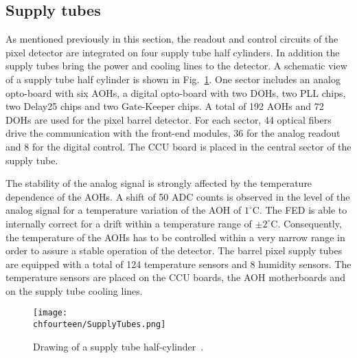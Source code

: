 \subsection{Supply tubes}

As mentioned previously in this section, the readout and control circuits of the pixel detector are integrated on four supply tube half cylinders.
In addition the supply tubes bring the power and cooling lines to the detector.
A schematic view of a supply tube half cylinder is shown in Fig.~\ref{fig:SupplyTubes}.
One sector includes an analog opto-board with six AOHs, a digital opto-board with two DOHs, two PLL chips, two Delay25 chips and two Gate-Keeper chips.
A total of 192 AOHs and 72 DOHs are used for the pixel barrel detector. For each sector, 44 optical fibers drive the communication with the front-end modules, 36 for the analog readout and 8 for the digital control. 
The CCU board is placed in the central sector of the supply tube.
  
 The stability of the analog signal is strongly affected by the temperature dependence of the AOHs.
A shift of 50 ADC counts is observed in the level of the analog signal for a temperature variation of the AOH of $1^\circ$\unit{C}.
The FED is able to internally correct for a drift within a temperature range of $\pm2^\circ$\unit{C}.
Consequently, the temperature of the AOHs has to be controlled within a very narrow range in order to assure a stable operation of the detector.
The barrel pixel supply tubes are equipped with a total of 124 temperature sensors and 8 humidity sensors.
The temperature sensors are placed on the CCU boards, the AOH motherboards and on the supply tube cooling lines.

\begin{figure}[!htb]
 \begin{center}
 \texttt{[image: \\chfourteen/SupplyTubes.png]}
 \end{center}
 \caption{Drawing of a supply tube half-cylinder~\cite{Kastli2007724}.}
 \label{fig:SupplyTubes}
\end{figure}

